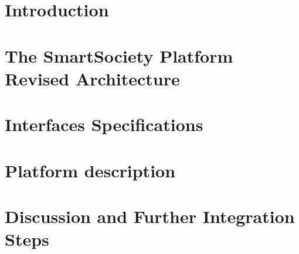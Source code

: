 \documentclass{SmartReport}
\begin{document}
\newpage


\section{Introduction}
\label{sec:intro}


\newpage


\section{The SmartSociety Platform Revised Architecture}
\label{sec:arch}

\newpage

\section{Interfaces Specifications}
\label{sec:apis}

\newpage


\section{Platform description}
\label{sec:sw}

\newpage

\section{Discussion and Further Integration Steps}
\label{sec:concl}

\newpage



%
\end{document}
